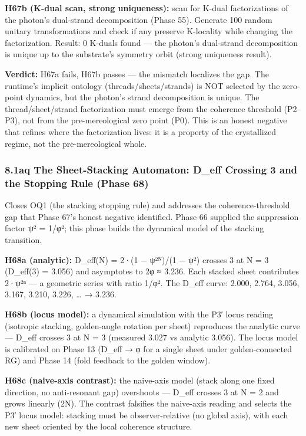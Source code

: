 \documentclass[
]{article}
\begin{document}
\textbf{H67b (K-dual scan, strong uniqueness):} scan for K-dual
factorizations of the photon's dual-strand decomposition (Phase 55).
Generate 100 random unitary transformations and check if any preserve
K-locality while changing the factorization. Result: 0 K-duals found ---
the photon's dual-strand decomposition is unique up to the substrate's
symmetry orbit (strong uniqueness result).

\textbf{Verdict:} H67a fails, H67b passes --- the mismatch localizes the
gap. The runtime's implicit ontology (threads/sheets/strands) is NOT
selected by the zero-point dynamics, but the photon's strand
decomposition is unique. The thread/sheet/strand factorization must
emerge from the coherence threshold (P2--P3), not from the
pre-mereological zero point (P0). This is an honest negative that
refines where the factorization lives: it is a property of the
crystallized regime, not the pre-mereological whole.

\subsubsection{8.1aq The Sheet-Stacking Automaton: D\_eff Crossing 3 and
the Stopping Rule (Phase
68)}\label{aq-the-sheet-stacking-automaton-d_eff-crossing-3-and-the-stopping-rule-phase-68}

Closes OQ1 (the stacking stopping rule) and addresses the
coherence-threshold gap that Phase 67's honest negative identified.
Phase 66 supplied the suppression factor ψ² = 1/φ²; this phase builds
the dynamical model of the stacking transition.

\textbf{H68a (analytic):} D\_eff(N) = 2·(1 − ψ²ᴺ)/(1 − ψ²) crosses 3 at
N = 3 (D\_eff(3) = 3.056) and asymptotes to 2φ ≈ 3.236. Each stacked
sheet contributes 2·ψ²ⁿ --- a geometric series with ratio 1/φ². The
D\_eff curve: 2.000, 2.764, 3.056, 3.167, 3.210, 3.226, \ldots{} →
3.236.

\textbf{H68b (locus model):} a dynamical simulation with the P3′ locus
reading (isotropic stacking, golden-angle rotation per sheet) reproduces
the analytic curve --- D\_eff crosses 3 at N = 3 (measured 3.027 vs
analytic 3.056). The locus model is calibrated on Phase 13 (D\_eff → φ
for a single sheet under golden-connected RG) and Phase 14 (fold
feedback to the golden window).

\textbf{H68c (naive-axis contrast):} the naive-axis model (stack along
one fixed direction, no anti-resonant gap) overshoots --- D\_eff crosses
3 at N = 2 and grows linearly (2N). The contrast falsifies the
naive-axis reading and selects the P3′ locus model: stacking must be
observer-relative (no global axis), with each new sheet oriented by the
local coherence structure.
\end{document}
